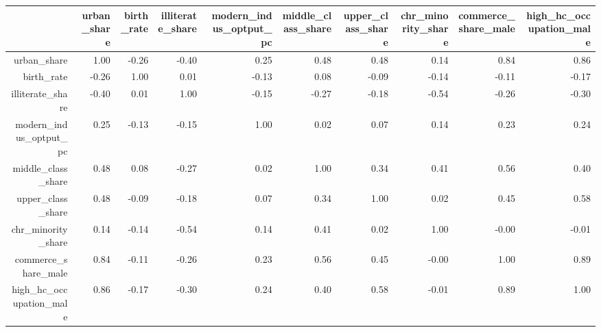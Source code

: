 \begin{table}[ht]
\centering
\begin{tabular}{rrrrrrrrrr}
  \hline
 & urban\_share & birth\_rate & illiterate\_share & modern\_indus\_optput\_pc & middle\_class\_share & upper\_class\_share & chr\_minority\_share & commerce\_share\_male & high\_hc\_occupation\_male \\ 
  \hline
urban\_share & 1.00 & -0.26 & -0.40 & 0.25 & 0.48 & 0.48 & 0.14 & 0.84 & 0.86 \\ 
  birth\_rate & -0.26 & 1.00 & 0.01 & -0.13 & 0.08 & -0.09 & -0.14 & -0.11 & -0.17 \\ 
  illiterate\_share & -0.40 & 0.01 & 1.00 & -0.15 & -0.27 & -0.18 & -0.54 & -0.26 & -0.30 \\ 
  modern\_indus\_optput\_pc & 0.25 & -0.13 & -0.15 & 1.00 & 0.02 & 0.07 & 0.14 & 0.23 & 0.24 \\ 
  middle\_class\_share & 0.48 & 0.08 & -0.27 & 0.02 & 1.00 & 0.34 & 0.41 & 0.56 & 0.40 \\ 
  upper\_class\_share & 0.48 & -0.09 & -0.18 & 0.07 & 0.34 & 1.00 & 0.02 & 0.45 & 0.58 \\ 
  chr\_minority\_share & 0.14 & -0.14 & -0.54 & 0.14 & 0.41 & 0.02 & 1.00 & -0.00 & -0.01 \\ 
  commerce\_share\_male & 0.84 & -0.11 & -0.26 & 0.23 & 0.56 & 0.45 & -0.00 & 1.00 & 0.89 \\ 
  high\_hc\_occupation\_male & 0.86 & -0.17 & -0.30 & 0.24 & 0.40 & 0.58 & -0.01 & 0.89 & 1.00 \\ 
   \hline
\end{tabular}
\end{table}
